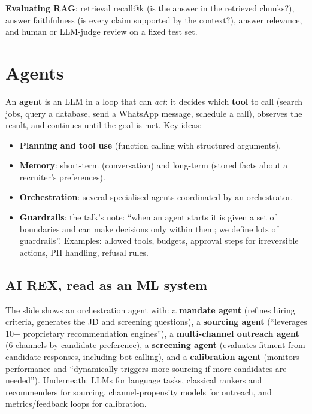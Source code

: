 \textbf{Evaluating RAG}: retrieval recall@k (is the answer in the retrieved chunks?), answer faithfulness (is every claim supported by the context?), answer relevance,
and human or LLM-judge review on a fixed test set.

\section{Agents}
An \textbf{agent} is an LLM in a loop that can \emph{act}: it decides which \textbf{tool} to call (search jobs, query a database, send a WhatsApp message, schedule a call),
observes the result, and continues until the goal is met. Key ideas:
\begin{itemize}
\item \textbf{Planning and tool use} (function calling with structured arguments).
\item \textbf{Memory}: short-term (conversation) and long-term (stored facts about a recruiter's preferences).
\item \textbf{Orchestration}: several specialised agents coordinated by an orchestrator.
\item \textbf{Guardrails}: the talk's note: ``when an agent starts it is given a set of boundaries and can make decisions only within them; we define lots of guardrails''.
  Examples: allowed tools, budgets, approval steps for irreversible actions, PII handling, refusal rules.
\end{itemize}

\subsection{AI REX, read as an ML system}
The slide shows an orchestration agent with: a \textbf{mandate agent} (refines hiring criteria, generates the JD and screening questions), a \textbf{sourcing agent}
(``leverages 10+ proprietary recommendation engines''), a \textbf{multi-channel outreach agent} (6 channels by candidate preference), a \textbf{screening agent} (evaluates
fitment from candidate responses, including bot calling), and a \textbf{calibration agent} (monitors performance and ``dynamically triggers more sourcing if more candidates
are needed''). Underneath: LLMs for language tasks, classical rankers and recommenders for sourcing, channel-propensity models for outreach, and metrics/feedback loops for
calibration.

